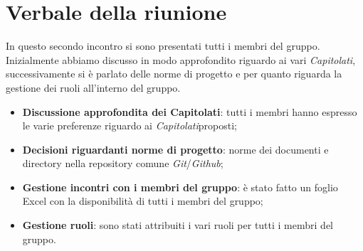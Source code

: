 \section{Verbale della riunione}
		In questo secondo incontro si sono presentati tutti i membri del gruppo. Inizialmente abbiamo discusso in modo approfondito riguardo ai vari \textit{Capitolati\glos}, successivamente si è parlato delle norme di progetto e per quanto riguarda la gestione dei ruoli all'interno del gruppo.
	\begin{itemize}
		\item \textbf {Discussione approfondita dei Capitolati\glos}: tutti i membri hanno espresso le varie preferenze riguardo ai \textit{Capitolati}\glo proposti;
		\item \textbf {Decisioni riguardanti norme di progetto}: norme dei documenti e directory nella repository comune \textit{Git}\glos/\textit{Github}\glos;
		\item \textbf {Gestione incontri con i membri del gruppo}: è stato fatto un foglio Excel con la disponibilità di tutti i membri del gruppo;
		\item \textbf {Gestione ruoli}: sono stati attribuiti i vari ruoli per tutti i membri del gruppo.
	\end{itemize}

